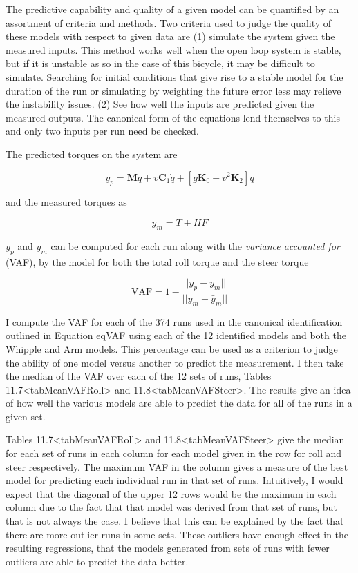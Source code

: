 \documentclass[a4paper]{article}
\begin{document}

The predictive capability and quality of a given model can be quantified
by an assortment of criteria and methods. Two criteria used to judge 
the quality of these models with respect to given data are (1) simulate 
the system given the measured inputs. This method works well when the open loop system is stable, but if it is
unstable as so in the case of this bicycle, it may be difficult to
simulate. Searching for initial conditions that give rise to a stable
model for the duration of the run or simulating by weighting the future
error less may relieve the instability issues. (2) See
how well the inputs are predicted given the measured outputs. The
canonical form of the equations lend themselves to this and only two
inputs per run need be checked.

The predicted torques on the system are

\[y_p = \mathbf{M} \ddot{q} + v \mathbf{C}_1 \dot{q} + [g \mathbf{K}_0 + v^2
\mathbf{K}_2] q\]

and the measured torques as

\[y_m = T + H F\]

$y_p$ and $y_m$ can be computed for each run along with the
\emph{variance accounted for} (VAF), by the model for both the total
roll torque and the steer torque

\[\textrm{VAF} = 1 - \frac{\vert \vert y_p - y_m\vert \vert }{\vert \vert y_m - \bar{y}_m\vert \vert }\]

I compute the VAF for each of the 374 runs used in the canonical
identification outlined in Equation eqVAF using each of the 12
identified models and both the Whipple and Arm models. This percentage
can be used as a criterion to judge the ability of one model
versus another to predict the measurement. I then take the median of the
VAF over each of the 12 sets of runs, Tables
11.7\textless{}tabMeanVAFRoll\textgreater{} and
11.8\textless{}tabMeanVAFSteer\textgreater{}. The results give an idea
of how well the various models are able to predict the data for all of
the runs in a given set.

Tables 11.7\textless{}tabMeanVAFRoll\textgreater{} and
11.8\textless{}tabMeanVAFSteer\textgreater{} give the median for each
set of runs in each column for each model given in the row for roll and
steer respectively. The maximum VAF in the column gives a measure of the
best model for predicting each individual run in that set of runs.
Intuitively, I would expect that the diagonal of the upper 12 rows would
be the maximum in each column due to the fact that that model was
derived from that set of runs, but that is not always the case. I
believe that this can be explained by the fact that there are more
outlier runs in some sets. These outliers have enough effect in the
resulting regressions, that the models generated from sets of runs with
fewer outliers are able to predict the data better.
\end{document}
